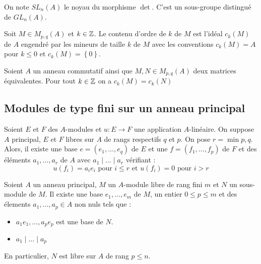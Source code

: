 \documentclass{cours}
\begin{document}
\begin{definition}
    On note $SL_{n}(A)$ le noyau du morphisme $\det$. C'est un sous-groupe distingué de $GL_{n}(A)$.
\end{definition}

\begin{definition}
    Soit $M \in M_{p, q}(A)$ et $k \in \mathbb{Z}$. Le contenu d'ordre de $k$ de $M$ est l'idéal $c_{k}(M)$ de $A$ engendré par les mineurs de taille $k$ de $M$ avec les conventions $c_{k}(M) = A$ pour $k \leq 0$ et $c_{k}(M) = \left\{0\right\}$.
\end{definition}

\begin{lemma}
    Soient $A$ un anneau commutatif ainsi que $M, N \in M_{p, q}(A)$ deux matrices équivalentes. Pour tout $k \in \mathbb{Z}$ on a $c_{k}(M) = c_{k}(N)$
\end{lemma}

\subsection{Modules de type fini sur un anneau principal}
\begin{theorem}
    Soient $E$ et $F$ des $A$-modules et $u : E \to F$ une application $A$-linéaire. On suppose $A$ principal, $E$ et $F$ libres sur $A$ de rangs respectifs $q$ et $p$. On pose $r = \min p, q$.
    Alors, il existe une base $e = \left(e_{1},\ldots, e_{q}\right)$ de $E$ et une $f = \left(f_{1}, \ldots, f_{p}\right)$ de $F$ et des éléments $a_{1}, \ldots, a_{r}$ de $A$ avec $a_{1} \mid \ldots \mid a_{r}$ vérifiant :
    \[
        u(f_{i}) = a_{i}e_{i} \text{ pour } i \leq r \text{ et } u(f_{i}) = 0 \text{ pour } i > r
    \]
\end{theorem}

\begin{theorem}
    Soient $A$ un anneau principal, $M$ un $A$-module libre de rang fini $m$ et $N$ un sous-module de $M$. Il existe une base $e_{1}, \ldots, e_{m}$ de $M$, un entier $0 \leq p \leq m$ et des élements $a_{1}, \ldots, a_{p} \in A$ non nuls tels que :
    \begin{itemize}
        \item $a_{1}e_{1}, \ldots, a_{p}e_{p}$ est une base de $N$.
        \item $a_{1} \mid \ldots \mid a_{p}$
    \end{itemize}
    En particulier, $N$ est libre sur $A$ de rang $p \leq n$.
\end{theorem}
\end{document}
